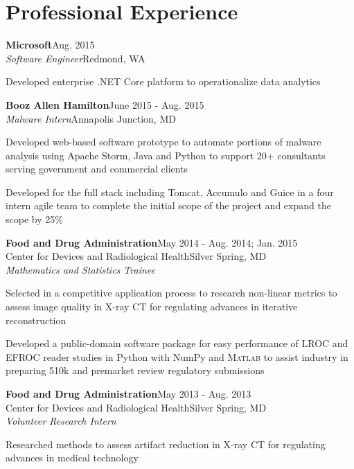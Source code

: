 \documentclass[letterpaper,12pt]{article}
\def \myrespresectionskip {-.25in}
\def \resumeitemizeskip{0in}
\def \jobskip{.075in}
\newcommand{\resheading}[5]{
\normalsize{\textbf{#1}}\hfill{\rmfamily\normalsize\textcolor{faded}{#2}} \\
\normalsize{#3}\hfill{\textcolor{faded}{\normalsize#4}}\\
\normalsize{#5}
\normalsize
}
\begin{document}
\section*{Professional Experience}
\resheading{{Microsoft}}{Aug. 2015}{\emph{Software Engineer}}{Redmond, WA}{}
{ \footnotesize
\vspace{-.2in}
      \begin{resumeitemize}
	\item{Developed enterprise .NET Core platform to operationalize data analytics} 
          \end{resumeitemize}
}
\resheading{{Booz Allen Hamilton}}{June 2015 \-- Aug. 2015}{\emph{Malware Intern}}{Annapolis Junction, MD}{}
{ \footnotesize
\vspace{-.2in}
      \begin{resumeitemize}
	\item{Developed web-based software prototype to automate portions of malware analysis using Apache Storm, Java and Python to support 20+ consultants serving government and commercial clients}
	\item{Developed for the full stack including Tomcat, Accumulo and Guice in a four intern agile team to complete the initial scope of the project and expand the scope by 25\%}
          \end{resumeitemize}
}
\vspace{\jobskip}
\resheading{{Food and Drug Administration}}{May 2014 \-- Aug. 2014; Jan. 2015}{{Center for Devices and Radiological Health}}{Silver Spring, MD}{\emph{Mathematics and Statistics Trainee}} 
   { \footnotesize
\vspace{\resumeitemizeskip}
      \begin{resumeitemize}
	 \item{Selected in a competitive application process to research non-linear metrics to assess image quality in {X-ray CT} for regulating advances in iterative reconstruction}
            \item{Developed a public-domain software package for easy performance of LROC and EFROC reader studies in Python with NumPy and \textsc{Matlab} to assist industry in preparing 510k and premarket review regulatory submissions}
          \end{resumeitemize}
   }
\vspace{\jobskip}
\resheading{{Food and Drug Administration}}{May 2013 \-- Aug. 2013}{{Center for Devices and Radiological Health}}{Silver Spring, MD}{\emph{Volunteer Research Intern}}
   { \footnotesize
\vspace{\resumeitemizeskip}
      \begin{resumeitemize}
	 \item{Researched methods to assess artifact reduction in {X-ray CT} for regulating advances in medical technology}
          \end{resumeitemize}
   }
\vspace{\myrespresectionskip}
\end{document}
